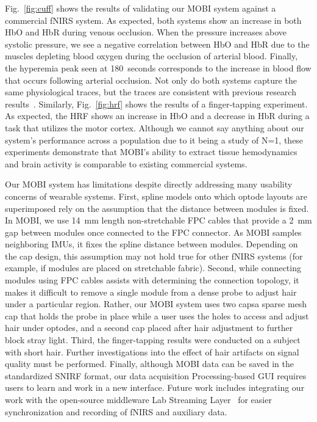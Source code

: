 Fig.~\ref{fig:cuff} shows the results of validating our \ac{MOBI} system against a commercial \ac{fNIRS} system. As expected, both systems show an increase in both \ac{HbO} and \ac{HbR} during venous occlusion. When the pressure increases above systolic pressure, we see a negative correlation between \ac{HbO} and \ac{HbR} due to the muscles depleting blood oxygen during the occlusion of arterial blood. Finally, the hyperemia peak seen at 180~seconds corresponds to the increase in blood flow that occurs following arterial occlusion. Not only do both systems capture the same physiological traces, but the traces are consistent with previous research results~\cite{Liu2022}. Similarly, Fig.~\ref{fig:hrf} shows the results of a finger-tapping experiment. As expected, the \ac{HRF} shows an increase in \ac{HbO} and a decrease in \ac{HbR} during a task that utilizes the motor cortex. Although we cannot say anything about our system's performance across a population due to it being a study of N=1, these experiments demonstrate that \ac{MOBI}'s ability to extract tissue hemodynamics and brain activity is comparable to existing commercial systems. 

Our \ac{MOBI} system has limitations despite directly addressing many usability concerns of wearable systems. First, spline models onto which optode layouts are superimposed rely on the assumption that the distance between modules is fixed. In \ac{MOBI}, we use 14~mm length non-stretchable \ac{FPC} cables that provide a 2~mm gap between modules once connected to the \ac{FPC} connector. As \ac{MOBI} samples neighboring \ac{IMU}s, it fixes the spline distance between modules. Depending on the cap design, this assumption may not hold true for other \ac{fNIRS} systems (for example, if modules are placed on stretchable fabric). Second, while connecting modules using \ac{FPC} cables assists with determining the connection topology, it makes it difficult to remove a single module from a dense probe to adjust hair under a particular region. Rather, our \ac{MOBI} system uses two caps\textemdash a sparse mesh cap that holds the probe in place while a user uses the holes to access and adjust hair under optodes, and a second cap placed after hair adjustment to further block stray light. Third, the finger-tapping results were conducted on a subject with short hair. Further investigations into the effect of hair artifacts on signal quality must be performed. Finally, although \ac{MOBI} data can be saved in the standardized \ac{SNIRF} format, our data acquisition Processing-based \ac{GUI} requires users to learn and work in a new interface. Future work includes integrating our work with the open-source middleware Lab Streaming Layer~\cite{LSL2014} for easier synchronization and recording of \ac{fNIRS} and auxiliary data. 


